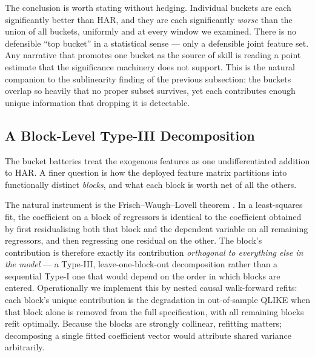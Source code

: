 The conclusion is worth stating without hedging. Individual buckets are each significantly
better than HAR, and they are each significantly \emph{worse} than the union of all
buckets, uniformly and at every window we examined. There is no defensible ``top bucket''
in a statistical sense --- only a defensible joint feature set. Any narrative that promotes
one bucket as the source of skill is reading a point estimate that the significance
machinery does not support. This is the natural companion to the sublinearity finding of
the previous subsection: the buckets overlap so heavily that no proper subset survives, yet
each contributes enough unique information that dropping it is detectable.

\subsection{A Block-Level Type-III Decomposition}

The bucket batteries treat the exogenous features as one undifferentiated addition to HAR.
A finer question is how the deployed feature matrix partitions into functionally distinct
\emph{blocks}, and what each block is worth net of all the others.

The natural instrument is the Frisch--Waugh--Lovell theorem
\citep{FrischWaugh1933,Lovell1963}. In a least-squares fit, the coefficient on a block of
regressors is identical to the coefficient obtained by first residualising both that block
and the dependent variable on all remaining regressors, and then regressing one residual on
the other. The block's contribution is therefore exactly its contribution \emph{orthogonal
to everything else in the model} --- a Type-III, leave-one-block-out decomposition rather
than a sequential Type-I one that would depend on the order in which blocks are entered.
Operationally we implement this by nested causal walk-forward refits: each block's unique
contribution is the degradation in out-of-sample QLIKE when that block alone is removed
from the full specification, with all remaining blocks refit optimally. Because the blocks
are strongly collinear, refitting matters; decomposing a single fitted coefficient vector
would attribute shared variance arbitrarily.

